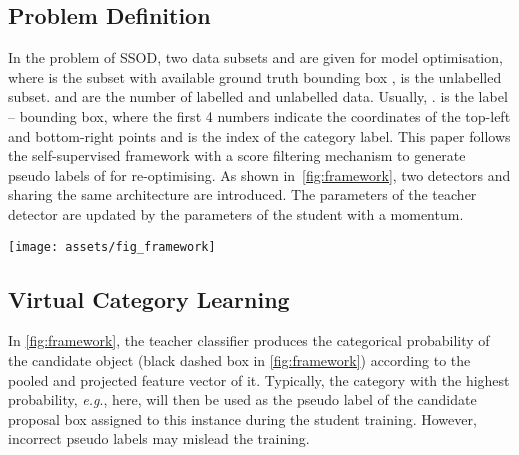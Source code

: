 \documentclass[runningheads]{llncs}
\def\eg{\emph{e.g}., } \def\Eg{\emph{E.g}., }
\begin{document}
\subsection{Problem Definition} 
In the problem of SSOD, two data subsets  and  are  given for model optimisation, where  is the subset with available ground truth bounding box ,  is the unlabelled subset.  and  are the number of labelled and unlabelled data. Usually, .  is the label -- bounding box, where the first 4 numbers indicate the coordinates of the top-left and bottom-right points and  is the index of the category label. This paper follows the self-supervised framework with a score filtering mechanism \cite{Yen-Cheng_2021_Unb} to generate pseudo labels  of  for re-optimising. As shown in~\cref{fig:framework}, two detectors  and  sharing the same architecture are introduced. The parameters of the teacher detector  are updated by the parameters of the student  with a momentum.

\begin{figure*}[t]
  \centering
   \texttt{[image: assets/fig\_framework]}
   \vspace{-1.2em}
   \caption{The pipeline of the proposed VC learning when dealing with a confusing sample. The regression branch is ignored for simplicity.  is the teacher model.  represents the student model. The box with the black dashed line on feature maps indicates the position of the pseudo label. When training the student classifier with a RPN-generated proposal box (pink dashed box in the figure) assigned to this pseudo label, the weight matrix  of the student classifier is extended by a virtual weight , which is transformed from the teacher feature vector  of the pseudo label area.}
   \label{fig:framework}
\vspace{-1em}
\end{figure*}

\subsection{Virtual Category Learning}
\label{sec:VCloss}

In \cref{fig:framework}, the teacher classifier produces the categorical probability of the candidate object (black dashed box in \cref{fig:framework}) according to the pooled and projected feature vector  of it. Typically, the category with the highest probability, \eg  here, will then be used as the pseudo label of the candidate proposal box assigned to this instance during the student training. However, incorrect pseudo labels may mislead the training.
\end{document}
